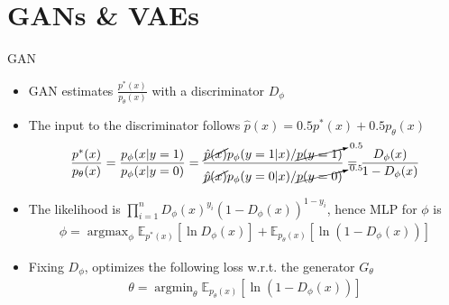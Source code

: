 \documentclass[compress]{beamer}
\newcommand{\expects}[2]{\mathbb{E}_{#1} \left[ #2 \right]}
\begin{document}
\section{GANs \& VAEs}
\begin{frame}[allowframebreaks]{GAN}
        \begin{itemize}
            \item GAN estimates $ \frac{p^*(x)}{p_{\theta}(x)} $ with a discriminator $D_{\phi}$
            \item The input to the discriminator follows $\hat{p}(x)=0.5 p^*(x) + 0.5p_{\theta}(x)$
                \begin{align*}
                    \frac{p^*(x)}{p_{\theta}(x)} = \frac{p_\phi(x|y=1)}{p_\phi(x|y=0)} = \frac{\cancel{\hat{p}(x)}p_\phi(y=1|x)/\cancelto{0.5}{p(y=1)}}{\cancel{\hat{p}(x)}p_\phi(y=0|x)/\cancelto{0.5}{p(y=0)}} = \frac{D_{\phi}(x)}{1-D_{\phi}(x)}   
                \end{align*}
            \item The likelihood is $\prod_{i=1}^n D_{\phi}(x)^{y_i}(1-D_{\phi}(x))^{1-y_i}$, hence MLP for $\phi$ is
                \begin{align*}
                    \phi = \mathop{argmax}_{\phi}\expects{p^*(x)}{\ln D_{\phi}(x)} + \expects{p_{\theta}(x)}{\ln(1-D_{\phi}(x))}
                \end{align*}
            \item Fixing $D_\phi$, optimizes the following loss w.r.t. the generator $G_{\theta}$
                \begin{align*}
                    \theta = \mathop{argmin}_{\theta} \expects{p_\theta(x)}{\ln (1-D_{\phi}(x))}
                \end{align*}
        \end{itemize}


\end{frame}
\end{document}

